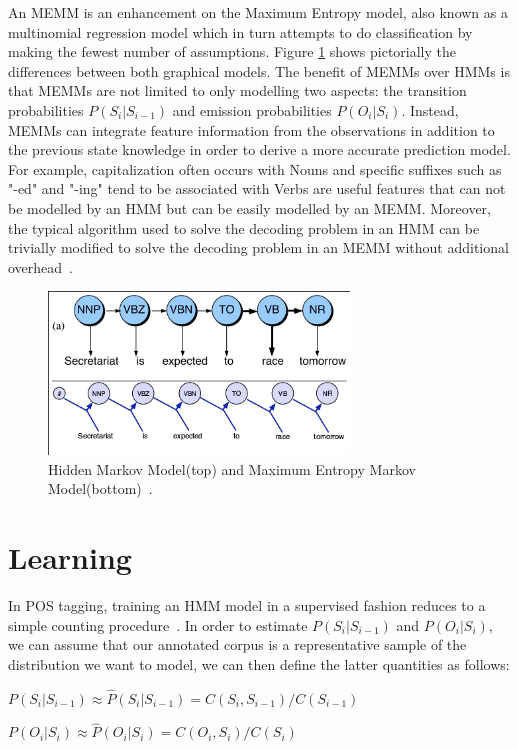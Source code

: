 \documentclass{acm_proc_article-sp}
\begin{document}
An MEMM is an enhancement on the Maximum Entropy model, also known as a multinomial regression model which in turn attempts to do classification by making the fewest number of assumptions. Figure \ref{hmmVmemm} shows pictorially the differences between both graphical models. The benefit of MEMMs over HMMs is that MEMMs are not limited to only modelling two aspects: the transition probabilities $P( S_i | S_{i-1} )$ and emission probabilities $P( O_i | S_i )$. Instead, MEMMs can integrate feature information from the observations in addition to the previous state knowledge in order to derive a more accurate prediction model. For example, capitalization often occurs with Nouns and specific suffixes such as "-ed" and "-ing" tend to be associated with Verbs are useful features that can not be modelled by an HMM but can be easily modelled by an MEMM. Moreover, the typical algorithm used to solve the decoding problem in an HMM can be trivially modified to solve the decoding problem in an MEMM without additional overhead~\cite{memmPaper}.
\begin{figure}[ht]
\centering
\includegraphics[width=80mm]{figures/memm.png}
\caption{Hidden Markov Model(top) and Maximum Entropy Markov Model(bottom)~\cite{nlpBook}. \label{hmmVmemm}}
\end{figure}

\section{Learning}
In POS tagging, training an HMM model in a supervised fashion reduces to a simple counting procedure~\cite{nlpBook}. In order to estimate $P( S_i | S_{i-1} )$ and $P( O_i | S_i )$, we can assume that our annotated corpus is a representative sample of the distribution we want to model, we can then define the latter quantities as follows:

$P( S_i | S_{i-1} ) \approx \hat{P}( S_i | S_{i-1} ) = C( S_i, S_{i-1} )/C( S_{i-1} )$

$P( O_i | S_i ) \approx \hat{P}( O_i | S_i ) = C( O_i, S_i )/C( S_i )$
\end{document}
